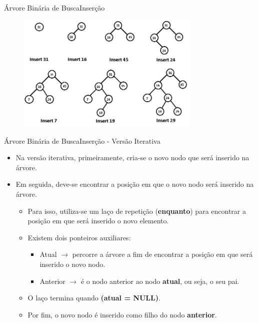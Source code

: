 \documentclass[aspectratio=169]{beamer}
\begin{document}

\begin{frame}{Árvore Binária de Busca}{Inserção}
\begin{figure}[!h]
  \centering
  \includegraphics[width=250pt]{imagens/insercao2.jpg}
  \label{fig_insercao2}
\end{figure}
\end{frame}

\begin{frame}{Árvore Binária de Busca}{Inserção - Versão Iterativa}
\begin{itemize}
\item Na versão iterativa, primeiramente, cria-se o novo nodo que será inserido na árvore.
\item Em seguida, deve-se encontrar a posição em que o novo nodo será inserido na árvore.
\begin{itemize}
\item Para isso, utiliza-se um laço de repetição ({\bf enquanto}) para encontrar a posição em que será inserido o novo elemento.
\item Existem dois ponteiros auxiliares:
\begin{itemize}
\item Atual $\rightarrow$ percorre a árvore a fim de encontrar a posição em que será inserido o novo nodo.
\item Anterior $\rightarrow$ é o nodo anterior ao nodo {\bf atual}, ou seja, o seu pai.
\end{itemize}
\item O laço termina quando {\bf (atual = NULL)}.
\item Por fim, o novo nodo é inserido como filho do nodo {\bf anterior}.
\end{itemize}
\end{itemize}
\end{frame}

\end{document}

